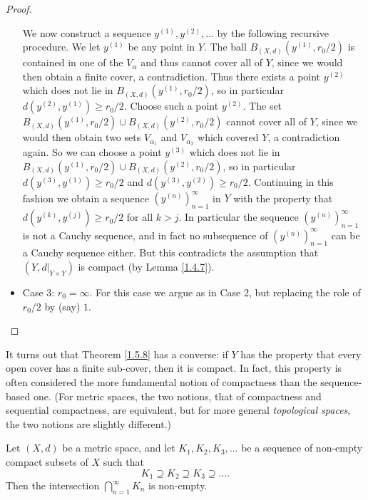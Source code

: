 \begin{proof}
\begin{itemize}
              We now construct a sequence \(y^{(1)}, y^{(2)}, \dots\) by the following recursive procedure.
              We let \(y^{(1)}\) be any point in \(Y\).
              The ball \(B_{(X, d)}(y^{(1)}, r_0 / 2)\) is contained in one of the \(V_{\alpha}\) and thus cannot cover all of \(Y\), since we would then obtain a finite cover, a contradiction.
              Thus there exists a point \(y^{(2)}\) which does not lie in \(B_{(X, d)}(y^{(1)}, r_0 / 2)\), so in particular \(d(y^{(2)}, y^{(1)}) \geq r_0 / 2\).
              Choose such a point \(y^{(2)}\).
              The set \(B_{(X, d)}(y^{(1)}, r_0 / 2) \cup B_{(X, d)}(y^{(2)}, r_0 / 2)\) cannot cover all of \(Y\), since we would then obtain two sets \(V_{\alpha_1}\) and \(V_{\alpha_2}\) which covered \(Y\), a contradiction again.
              So we can choose a point \(y^{(3)}\) which does not lie in \(B_{(X, d)}(y^{(1)}, r_0 / 2) \cup B_{(X, d)}(y^{(2)}, r_0 / 2)\), so in particular \(d(y^{(3)}, y^{(1)}) \geq r_0 / 2\) and \(d(y^{(3)}, y^{(2)}) \geq r_0 / 2\).
              Continuing in this fashion we obtain a sequence \((y^{(n)})_{n = 1}^\infty\) in \(Y\) with the property that \(d(y^{(k)}, y^{(j)}) \geq r_0 / 2\) for all \(k > j\).
              In particular the sequence \((y^{(n)})_{n = 1}^\infty\) is not a Cauchy sequence, and in fact no subsequence of \((y^{(n)})_{n = 1}^\infty\) can be a Cauchy sequence either.
              But this contradicts the assumption that \((Y, d|_{Y \times Y})\) is compact (by Lemma \ref{1.4.7}).
        \item Case 3:
              \(r_0 = \infty\).
              For this case we argue as in Case 2, but replacing the role of \(r_0 / 2\) by (say) \(1\).
    \end{itemize}
\end{proof}

\begin{note}
    It turns out that Theorem \ref{1.5.8} has a converse:
    if \(Y\) has the property that every open cover has a ﬁnite sub-cover, then it is compact.
    In fact, this property is often considered the more fundamental notion of compactness than the sequence-based one.
    (For metric spaces, the two notions, that of compactness and sequential compactness, are equivalent, but for more general \emph{topological spaces}, the two notions are slightly diﬀerent.)
\end{note}

\begin{corollary}\label{1.5.9}
    Let \((X, d)\) be a metric space, and let \(K_1, K_2, K_3, \dots\) be a sequence of non-empty compact subsets of \(X\) such that
    \[
        K_1 \supseteq K_2 \supseteq K_3 \supseteq \dots.
    \]
    Then the intersection \(\bigcap_{n = 1}^\infty K_n\) is non-empty.
\end{corollary}

